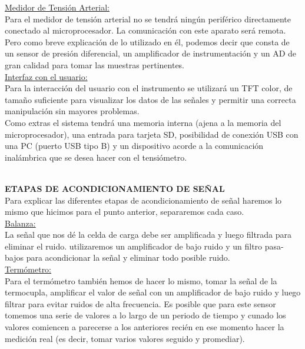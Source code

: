 \documentclass[11pt]{report}
\begin{document}
\noindent \underline{Medidor de Tensión Arterial:}\\
Para el medidor de tensión arterial no se tendrá ningún periférico directamente conectado al microprocesador. La comunicación con este aparato será remota. Pero como breve explicación de lo utilizado en él, podemos decir que consta de un sensor de presión diferencial, un amplificador de instrumentación y un AD de gran calidad para tomar las muestras pertinentes.\\

\noindent \underline{Interfaz con el usuario:}\\
Para la interacción del usuario con el instrumento se utilizará un TFT color, de tamaño suficiente para visualizar los datos de las señales y permitir una correcta manipulación sin mayores problemas. \\
Como extras el sistema tendrá una memoria interna (ajena a la memoria del microprocesador), una entrada para tarjeta SD, posibilidad de conexión USB con una PC (puerto USB tipo B) y un dispositivo acorde a la comunicación inalámbrica
que se desea hacer con el tensiómetro.\\

\hfill
\\ \hfill

 \noindent \large \textbf{ETAPAS DE ACONDICIONAMIENTO DE SEÑAL} \\

Para explicar las diferentes etapas de acondicionamiento de señal haremos lo mismo que hicimos para el punto anterior, separaremos cada caso.\\

\noindent \underline{Balanza:} \\
La señal que nos dé la celda de carga debe ser amplificada y luego filtrada para
eliminar el ruido. utilizaremos un amplificador de bajo ruido y un filtro pasa-bajos para acondicionar la señal y eliminar todo posible ruido.\\

\noindent \underline{Termómetro:} \\
Para el termómetro también hemos de hacer lo mismo, tomar la señal de la termocupla, amplificar el valor de señal con un amplificador de bajo ruido y luego filtrar para evitar ruidos de alta frecuencia. Es posible que para este sensor tomemos una serie de valores a lo largo de un periodo de tiempo y cunado los valores comiencen a parecerse a los anteriores recién en ese momento hacer la medición real (es decir, tomar varios valores seguido y promediar). \\
\end{document}
